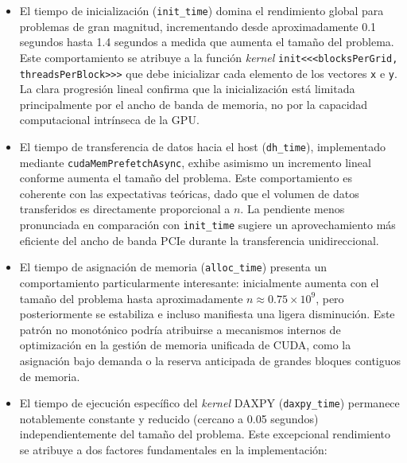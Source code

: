         \begin{itemize}
        
            \item El tiempo de inicialización (\texttt{init\_time}) domina el rendimiento global para problemas de gran magnitud, incrementando desde aproximadamente 0.1 segundos hasta 1.4 segundos a medida que aumenta el tamaño del problema. Este comportamiento se atribuye a la función \textit{kernel} \texttt{init\textless\textless\textless blocksPerGrid, threadsPerBlock\textgreater\textgreater\textgreater} que debe inicializar cada elemento de los vectores \texttt{x} e \texttt{y}. La clara progresión lineal confirma que la inicialización está limitada principalmente por el ancho de banda de memoria, no por la capacidad computacional intrínseca de la GPU.
            
            \item El tiempo de transferencia de datos hacia el host (\texttt{dh\_time}), implementado mediante \texttt{cudaMemPrefetchAsync}, exhibe asimismo un incremento lineal conforme aumenta el tamaño del problema. Este comportamiento es coherente con las expectativas teóricas, dado que el volumen de datos transferidos es directamente proporcional a $n$. La pendiente menos pronunciada en comparación con \texttt{init\_time} sugiere un aprovechamiento más eficiente del ancho de banda PCIe durante la transferencia unidireccional.
        
            \item El tiempo de asignación de memoria (\texttt{alloc\_time}) presenta un comportamiento particularmente interesante: inicialmente aumenta con el tamaño del problema hasta aproximadamente $n \approx 0.75 \times 10^9$, pero posteriormente se estabiliza e incluso manifiesta una ligera disminución. Este patrón no monotónico podría atribuirse a mecanismos internos de optimización en la gestión de memoria unificada de CUDA, como la asignación bajo demanda o la reserva anticipada de grandes bloques contiguos de memoria.
        
            \item El tiempo de ejecución específico del \textit{kernel} DAXPY (\texttt{daxpy\_time}) permanece notablemente constante y reducido (cercano a 0.05 segundos) independientemente del tamaño del problema. Este excepcional rendimiento se atribuye a dos factores fundamentales en la implementación:
        
                \begin{enumerate}
                

\end{enumerate}
\end{itemize}

